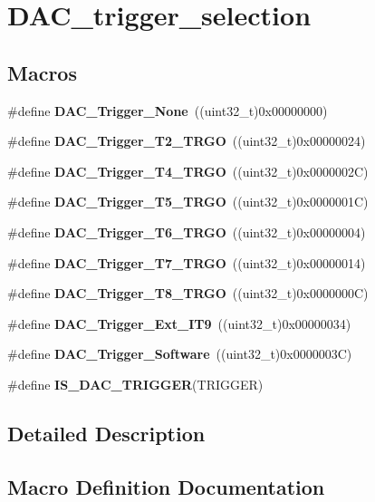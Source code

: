 \section{D\+A\+C\+\_\+trigger\+\_\+selection}
\label{group__DAC__trigger__selection}
\subsection*{Macros}
\begin{DoxyCompactItemize}
\item 
\#define \textbf{ D\+A\+C\+\_\+\+Trigger\+\_\+\+None}~((uint32\+\_\+t)0x00000000)
\item 
\#define \textbf{ D\+A\+C\+\_\+\+Trigger\+\_\+\+T2\+\_\+\+T\+R\+GO}~((uint32\+\_\+t)0x00000024)
\item 
\#define \textbf{ D\+A\+C\+\_\+\+Trigger\+\_\+\+T4\+\_\+\+T\+R\+GO}~((uint32\+\_\+t)0x0000002\+C)
\item 
\#define \textbf{ D\+A\+C\+\_\+\+Trigger\+\_\+\+T5\+\_\+\+T\+R\+GO}~((uint32\+\_\+t)0x0000001\+C)
\item 
\#define \textbf{ D\+A\+C\+\_\+\+Trigger\+\_\+\+T6\+\_\+\+T\+R\+GO}~((uint32\+\_\+t)0x00000004)
\item 
\#define \textbf{ D\+A\+C\+\_\+\+Trigger\+\_\+\+T7\+\_\+\+T\+R\+GO}~((uint32\+\_\+t)0x00000014)
\item 
\#define \textbf{ D\+A\+C\+\_\+\+Trigger\+\_\+\+T8\+\_\+\+T\+R\+GO}~((uint32\+\_\+t)0x0000000\+C)
\item 
\#define \textbf{ D\+A\+C\+\_\+\+Trigger\+\_\+\+Ext\+\_\+\+I\+T9}~((uint32\+\_\+t)0x00000034)
\item 
\#define \textbf{ D\+A\+C\+\_\+\+Trigger\+\_\+\+Software}~((uint32\+\_\+t)0x0000003\+C)
\item 
\#define \textbf{ I\+S\+\_\+\+D\+A\+C\+\_\+\+T\+R\+I\+G\+G\+ER}(T\+R\+I\+G\+G\+ER)
\end{DoxyCompactItemize}


\subsection{Detailed Description}


\subsection{Macro Definition Documentation}
\mbox{\label{group__DAC__trigger__selection_ga67c15b2c26246a2304f9db28e25adcc4}} 
